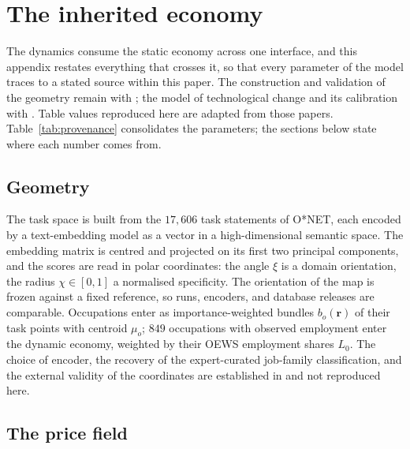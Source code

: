 \documentclass[12pt, a4paper]{article}
\newcommand{\rr}{\mathbf{r}}
\begin{document}
\appendix
\section{The inherited economy}
\label{app:inherited}

The dynamics consume the static economy across one interface, and this
appendix restates everything that crosses it, so that every parameter of
the model traces to a stated source within this paper. The construction
and validation of the geometry remain with \textcite{storck2026geometry};
the model of technological change and its calibration with
\textcite{storck2026fields}. Table values reproduced here are adapted
from those papers. Table~\ref{tab:provenance} consolidates the
parameters; the sections below state where each number comes from.

\subsection*{Geometry}

The task space is built from the $17{,}606$ task statements of O*NET,
each encoded by a text-embedding model as a vector in a high-dimensional
semantic space. The embedding matrix is centred and projected on its
first two principal components, and the scores are read in polar
coordinates: the angle $\xi$ is a domain orientation, the radius
$\chi \in [0,1]$ a normalised specificity. The orientation of the map is
frozen against a fixed reference, so runs, encoders, and database
releases are comparable. Occupations enter as importance-weighted
bundles $b_o(\rr)$ of their task points with centroid $\mu_o$;
$849$ occupations with observed employment enter the dynamic economy,
weighted by their OEWS employment shares $L_0$. The choice of encoder,
the recovery of the expert-curated job-family classification, and the
external validity of the coordinates are established in
\textcite{storck2026geometry} and not reproduced here.

\subsection*{The price field}
\end{document}
